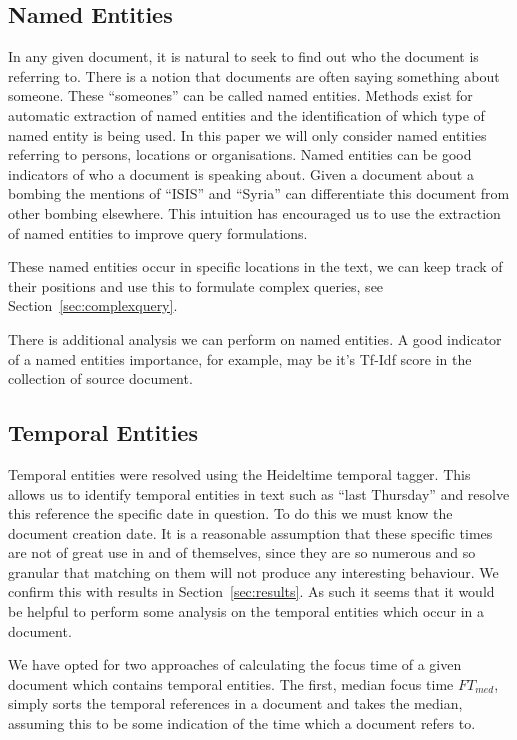 \documentclass{mpaper}
\begin{document}
\subsection{Named Entities}
In any given document, it is natural to seek to find out who the document is referring to. There is a notion that documents are often saying something about someone.
These ``someones'' can be called named entities. 
Methods exist for automatic extraction of named entities and the identification of which type of named entity is being used.
In this paper we will only consider named entities referring to persons, locations or organisations.
Named entities can be good indicators of who a document is speaking about.
Given a document about a bombing the mentions of ``ISIS'' and ``Syria'' can differentiate this document from other bombing elsewhere.
This intuition has encouraged us to use the extraction of named entities to improve query formulations.

These named entities occur in specific locations in the text, we can keep track of their positions and use this to formulate complex queries, see Section~\ref{sec:complexquery}.

There is additional analysis we can perform on named entities.
A good indicator of a named entities importance, for example, may be it's Tf-Idf score in the collection of source document.

\subsection{Temporal Entities}
Temporal entities were resolved using the Heideltime temporal tagger. This allows us to identify temporal entities in text such as ``last Thursday'' and resolve this reference the specific date in question. To do this we must know the document creation date.
It is a reasonable assumption that these specific times are not of great use in and of themselves, since they are so numerous and so granular that matching on them will not produce any interesting behaviour. We confirm this with results in Section~\ref{sec:results}. As such it seems that it would be helpful to perform some analysis on the temporal entities which occur in a document.

We have opted for two approaches of calculating the focus time of a given document which contains temporal entities.
The first, median focus time $FT_{med}$, simply sorts the temporal references in a document and takes the median, assuming this to be some indication of the time which a document refers to.
\end{document}
